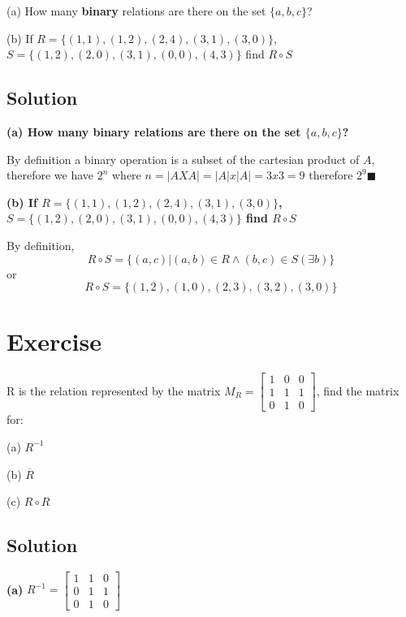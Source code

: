 \documentclass[paper=a4, fontsize=11pt]{scrartcl} %
\numberwithin{equation}{section} %
\numberwithin{figure}{section} %
\numberwithin{table}{section} %
\begin{document}
(a) How many \textbf{binary} relations are there on the set $\{a,b,c\}$?

(b) If $R = \{(1,1),(1,2),(2,4),(3,1),(3,0)\}$, $S=\{(1,2),(2,0),(3,1),(0,0),(4,3)\}$ find $R \circ S$

\subsection{Solution}

\textbf{(a) How many \textbf{binary} relations are there on the set $\{a,b,c\}$?} 

By definition a binary operation is a subset of the cartesian product of $A$, therefore we have $2^n$ where $n = \vert A X A \vert = \vert A \vert x \vert A \vert = 3 x 3 = 9$ therefore $2^9 \blacksquare$ 

\textbf{(b) If $R = \{(1,1),(1,2),(2,4),(3,1),(3,0)\}$, $S=\{(1,2),(2,0),(3,1),(0,0),(4,3)\}$ find $R \circ S$} 

By definition, $$R \circ S = \{ (a,c) \vert (a,b) \in R \land (b,c) \in S (\exists b) \}$$ or $$R \circ S  = \{ (1,2), (1,0), (2,3), (3,2), (3,0) \}$$


\section{Exercise}

R is the relation represented by the matrix $M_R = 
\begin{bmatrix}
1 & 0 & 0 \\
1 & 1 & 1 \\
0 & 1 & 0
\end{bmatrix}
$, find the matrix for:

(a) $R^{-1}$

(b) $\overline{R}$

(c) $R \circ R$

\subsection{Solution}

\textbf{(a)} $R^{-1} = \begin{bmatrix}
1 & 1 & 0 \\
0 & 1 & 1 \\
0 & 1 & 0
\end{bmatrix}
$
\end{document}
